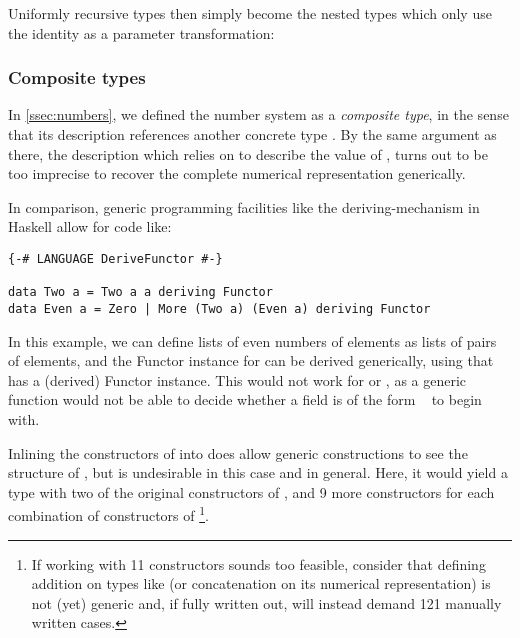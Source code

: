 Uniformly recursive types then simply become the nested types which only use the identity as a parameter transformation:

\subsubsection{Composite types}
In \autoref{ssec:numbers}, we defined the number system  as a \emph{composite type}, in the sense that its description references another concrete type . By the same argument as there, the description  which relies on  to describe the value of , turns out to be too imprecise to recover the complete numerical representation generically. 

In comparison, generic programming facilities like the deriving-mechanism in Haskell allow for code like:
\begin{verbatim}
{-# LANGUAGE DeriveFunctor #-}

data Two a = Two a a deriving Functor
data Even a = Zero | More (Two a) (Even a) deriving Functor    
\end{verbatim}
In this example, we can define lists of even numbers of elements as lists of pairs of elements, and the Functor instance for  can be derived generically, using that  has a (derived) Functor instance. This would not work for  or , as a generic function would not be able to decide whether a field is of the form \  to begin with. 

Inlining the constructors of  into  does allow generic constructions to see the structure of , but is undesirable in this case and in general. Here, it would yield a type with two of the original constructors of , and 9 more constructors for each combination of constructors of \footnote{If working with 11 constructors sounds too feasible, consider that defining addition on types like  (or concatenation on its numerical representation) is not (yet) generic and, if fully written out, will instead demand 121 manually written cases.}.


